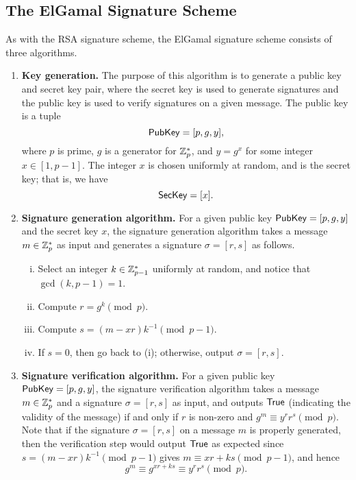 \subsection{The ElGamal Signature Scheme}
As with the RSA signature scheme, the ElGamal signature scheme consists of three algorithms. 
\begin{enumerate}
    \item \textbf{Key generation.} The purpose of this algorithm is to generate 
    a public key and secret key pair, where the secret key is used to generate 
    signatures and the public key is used to verify signatures on a given message. 
    The public key is a tuple 
    \[ {\sf PubKey} = [p, g, y], \] 
    where $p$ is prime, $g$ is a generator for $\mathbb{Z}_p^*$, and $y = g^x$ for some 
    integer $x \in [1, p-1]$. The integer $x$ is chosen uniformly at random, 
    and is the secret key; that is, we have 
    \[ {\sf SecKey} = [x]. \] 

    \item \textbf{Signature generation algorithm.} For a given public key 
    ${\sf PubKey} = [p, g, y]$ and the secret key $x$, the signature generation 
    algorithm takes a message $m \in \mathbb{Z}_p^*$ as input and generates a 
    signature $\sigma = [r, s]$ as follows. 
    \begin{enumerate}[(i)]
        \item Select an integer $k \in \mathbb{Z}_{p-1}^*$ uniformly at random, and notice 
        that $\gcd(k, p-1) = 1$. 
        \item Compute $r = g^k \pmod p$. 
        \item Compute $s = (m - xr)k^{-1} \pmod{p-1}$. 
        \item If $s = 0$, then go back to (i); otherwise, output $\sigma = [r, s]$. 
    \end{enumerate}

    \item \textbf{Signature verification algorithm.} For a given public key 
    ${\sf PubKey} = [p, g, y]$, the signature verification algorithm takes a message 
    $m \in \mathbb{Z}_p^*$ and a signature $\sigma = [r, s]$ as input, and outputs 
    ${\sf True}$ (indicating the validity of the message) if and only if 
    $r$ is non-zero and $g^m \equiv y^r r^s \pmod p$. Note that if the 
    signature $\sigma = [r, s]$ on a message $m$ is properly generated, then 
    the verification step would output ${\sf True}$ as expected since 
    $s = (m - xr)k^{-1} \pmod{p-1}$ gives $m \equiv xr + ks \pmod{p-1}$, and hence 
    \[ g^m \equiv g^{xr+ks} \equiv y^r r^s \pmod p. \] 
\end{enumerate}

